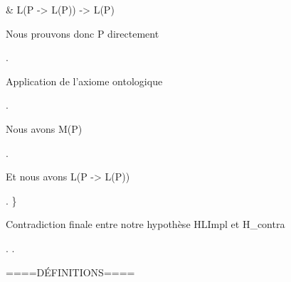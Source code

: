 \documentclass[10pt]{report}
\begin{document}
\begin{coqdoccode}
\begin{coqdoccomment}
\&\coqdocindent{0.50em}
L(P\coqdocindent{0.50em}
->\coqdocindent{0.50em}
L(P))\coqdocindent{0.50em}
->\coqdocindent{0.50em}
L(P)\coqdocindent{0.50em}
\end{coqdoccomment}
\coqdoceol
\coqdocemptyline
\coqdocindent{2.00em}
\begin{coqdoccomment}
\coqdocindent{0.50em}
Nous\coqdocindent{0.50em}
prouvons\coqdocindent{0.50em}
donc\coqdocindent{0.50em}
P\coqdocindent{0.50em}
directement\coqdocindent{0.50em}
\end{coqdoccomment}
\coqdoceol
\coqdocindent{2.00em}
 .\coqdoceol
\coqdocemptyline
\coqdocindent{2.00em}
\begin{coqdoccomment}
\coqdocindent{0.50em}
Application\coqdocindent{0.50em}
de\coqdocindent{0.50em}
l'axiome\coqdocindent{0.50em}
ontologique\coqdocindent{0.50em}
\end{coqdoccomment}
\coqdoceol
\coqdocindent{2.00em}
 .\coqdoceol
\coqdocindent{2.00em}
\begin{coqdoccomment}
\coqdocindent{0.50em}
Nous\coqdocindent{0.50em}
avons\coqdocindent{0.50em}
M(P)\coqdocindent{0.50em}
\end{coqdoccomment}
\coqdoceol
\coqdocindent{2.00em}
 .\coqdoceol
\coqdocindent{2.00em}
\begin{coqdoccomment}
\coqdocindent{0.50em}
Et\coqdocindent{0.50em}
nous\coqdocindent{0.50em}
avons\coqdocindent{0.50em}
L(P\coqdocindent{0.50em}
->\coqdocindent{0.50em}
L(P))\coqdocindent{0.50em}
\end{coqdoccomment}
\coqdoceol
\coqdocindent{2.00em}
 .\coqdoceol
\coqdocindent{1.00em}
\}\coqdoceol
\coqdocindent{1.00em}
\coqdoceol
\coqdocindent{1.00em}
\begin{coqdoccomment}
\coqdocindent{0.50em}
Contradiction\coqdocindent{0.50em}
finale\coqdocindent{0.50em}
entre\coqdocindent{0.50em}
notre\coqdocindent{0.50em}
hypothèse\coqdocindent{0.50em}
HLImpl\coqdocindent{0.50em}
et\coqdocindent{0.50em}
H\_contra\coqdocindent{0.50em}
\end{coqdoccomment}
\coqdoceol
\coqdocindent{1.00em}
.\coqdoceol
\coqdocnoindent
{}.\coqdoceol
\coqdocemptyline
\coqdocnoindent
\begin{coqdoccomment}
\coqdocindent{0.50em}
====DÉFINITIONS====\coqdocindent{0.50em}
\end{coqdoccomment}

\end{coqdoccode}
\end{document}

